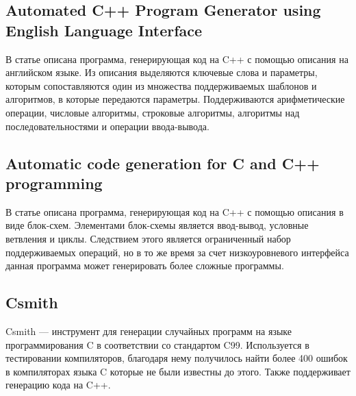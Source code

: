 


\subsection{Automated C++ Program Generator using English Language Interface}

В статье \cite{pg-eli} описана программа, генерирующая код на C++ с помощью описания на английском языке.
Из описания выделяются ключевые слова и параметры, которым сопоставляются один из множества поддерживаемых шаблонов и алгоритмов, в которые передаются параметры.
Поддерживаются арифметические операции, числовые алгоритмы, строковые алгоритмы, алгоритмы над последовательностями и операции ввода-вывода.

 
\subsection{Automatic code generation for C and C++ programming}

В статье \cite{acg-2021} описана программа, генерирующая код на C++ с помощью описания в виде блок-схем.
Элементами блок-схемы является ввод-вывод, условные ветвления и циклы.
Следствием этого является ограниченный набор поддерживаемых операций,
но в то же время за счет низкоуровневого интерфейса данная программа может генерировать более сложные программы.

\subsection{Csmith}

Csmith --- инструмент для генерации случайных программ на языке программирования C в соответствии со стандартом C99.
Используется в тестировании компиляторов, благодаря нему получилось найти более 400 ошибок в компиляторах языка C которые не были известны до этого.
Также поддерживает генерацию кода на C++. \cite{csmith}
% 


